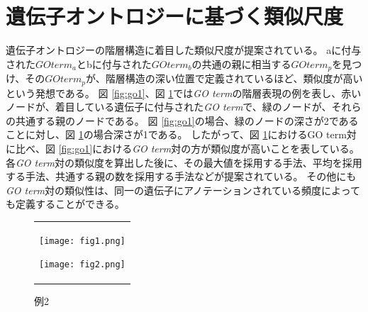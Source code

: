 \documentclass[titlepage,12pt]{jreport}
\begin{document}

\section{遺伝子オントロジーに基づく類似尺度\label{ref:go-term}}
遺伝子オントロジーの階層構造に着目した類似尺度が提案されている。 aに付与された$GO term_a$とbに付与された$GO term_b$の共通の親に相当する$GO term_p$を見つけ、その$GO term_p$が、階層構造の深い位置で定義されているほど、類似度が高いという発想である。 図 \ref{fig:go1}、図 \ref{fig:go2}では{\it GO term}の階層表現の例を表し、赤いノードが、着目している遺伝子に付与された{\it GO term}で、緑のノードが、それらの共通する親のノードである。 図 \ref{fig:go1}の場合、緑のノードの深さが2であることに対し、図 \ref{fig:go2}の場合深さが1である。 したがって、図 \ref{fig:go2}におけるGO term対に比べ、図 \ref{fig:go1}における{\it GO term}対の方が類似度が高いことを表している。 各{\it GO term}対の類似度を算出した後に、その最大値を採用する手法、平均を採用する手法、共通する親の数を採用する手法などが提案されている。 その他にも{\it GO term}対の類似性は、同一の遺伝子にアノテーションされている頻度によっても定義することができる\cite{wu13}。

\begin{figure}[tbp]
	\begin{tabular}{c}
		\begin{minipage}{0.5\hsize}
			\begin{center}
				\texttt{[image: fig1.png]}
				\caption{例1}
				\label{fig:go1}
			\end{center}
		\end{minipage}

		\begin{minipage}{0.5\hsize}
			\begin{center}
				\texttt{[image: fig2.png]}
				\caption{例2}
				\label{fig:go2}
			\end{center}
		\end{minipage}
	\end{tabular}
\end{figure}
\end{document}
